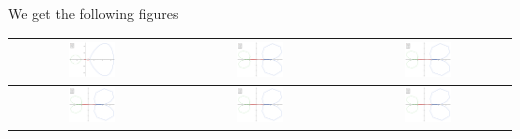 \documentclass[a4paper,10pt]{article}
\begin{document}
 We get the following figures
\begin{table}[!ht]
 \begin{tabular}{|c|c|c|}
  \hline
  \includegraphics[width=0.3\textwidth]{product_threshold_test1_threshold-2.png} & 
  \includegraphics[width=0.3\textwidth]{product_threshold_test1_threshold-3.png} &
  \includegraphics[width=0.3\textwidth]{product_threshold_test1_threshold-4.png} \\\hline
  \includegraphics[width=0.3\textwidth]{product_threshold_test1_threshold-5.png} & 
  \includegraphics[width=0.3\textwidth]{product_threshold_test1_threshold-6.png} &
  \includegraphics[width=0.3\textwidth]{product_threshold_test1_threshold-7.png} \\\hline

\end{tabular}
\end{table}
\end{document}
